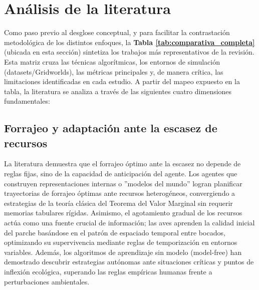 \documentclass[conference]{IEEEtran}
\begin{document}

\section{Análisis de la literatura}

Como paso previo al desglose conceptual, y para facilitar la contrastación 
metodológica de los distintos enfoques, la 
\textbf{Tabla \ref{tab:comparativa_completa}} (ubicada en esta sección) sintetiza los 
trabajos más representativos de la revisión. Esta matriz cruza las 
técnicas algorítmicas, los entornos de simulación (datasets/Gridworlds), 
las métricas principales y, de manera crítica, las limitaciones 
identificadas en cada estudio. A partir del mapeo expuesto en la tabla, 
la literatura se analiza a través de las siguientes cuatro dimensiones 
fundamentales:

\subsection{Forrajeo y adaptación ante la escasez de recursos}
La literatura demuestra que el forrajeo óptimo ante la escasez no depende de 
reglas fijas, sino de la capacidad de anticipación del agente. Los agentes que 
construyen representaciones internas o ''modelos del mundo'' logran planificar 
trayectorias de forrajeo óptimas ante recursos heterogéneos, convergiendo a 
estrategias de la teoría clásica del Teorema del Valor Marginal sin requerir 
memorias tabulares rígidas. Asimismo, el agotamiento gradual de los recursos 
actúa como una fuente crucial de información; las aves aprenden la calidad 
inicial del parche basándose en el patrón de espaciado temporal entre bocados, 
optimizando su supervivencia mediante reglas de temporización en entornos 
variables. Además, los algoritmos de aprendizaje sin modelo (model-free) han 
demostrado descubrir estrategias autónomas ante situaciones críticas y puntos 
de inflexión ecológica, superando las reglas empíricas humanas frente a 
perturbaciones ambientales.
\end{document}
